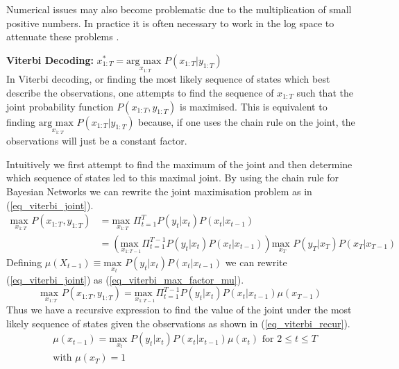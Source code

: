 \documentclass[../masters.tex]{subfiles}
\begin{document}
Numerical issues may also become problematic due to the multiplication of small positive numbers. In practice it is often necessary to work in the log space to attenuate these problems \cite{barber}. 

\textbf{Viterbi Decoding:} $x_{1:T}^* = \underset{x_{1:T}}{\text{arg max }} P(x_{1:T}|y_{1:T})$ \\
In Viterbi decoding, or finding the most likely sequence of states which best describe the observations, one attempts to find the sequence of $x_{1:T}$ such that the joint probability function $P(x_{1:T}, y_{1:T})$ is maximised. This is equivalent to finding $ \underset{x_{1:T}}{\text{arg max }} P(x_{1:T}|y_{1:T})$ because, if one uses the chain rule on the joint, the observations will just be a constant factor. 

Intuitively we first attempt to find the maximum of the joint and then determine which sequence of states led to this maximal joint. By using the chain rule for Bayesian Networks we can rewrite the joint maximisation problem as in (\ref{eq_viterbi_joint}).
\begin{equation}
\begin{aligned}
\underset{x_{1:T}}{\text{max }} P(x_{1:T}, y_{1:T}) &= \underset{x_{1:T}}{\text{max }} \Pi_{t=1}^T P(y_t|x_t) P(x_t|x_{t-1})\\
&= \left(\underset{x_{1:T-1}}{\text{max }} \Pi_{t=1}^{T-1} P(y_t|x_t) P(x_t|x_{t-1}) \right) \underset{x_{T}}{\text{max }} P(y_T|x_T) P(x_T|x_{T-1})
\end{aligned}
\label{eq_viterbi_joint}
\end{equation}
Defining $\mu(X_{t-1}) \equiv \underset{x_{t}}{\text{max }} P(y_t|x_t) P(x_t|x_{t-1})$ we can rewrite (\ref{eq_viterbi_joint}) as (\ref{eq_viterbi_max_factor_mu}).
\begin{equation}
\underset{x_{1:T}}{\text{max }} P(x_{1:T}, y_{1:T}) =\underset{x_{1:T-1}}{\text{max }} \Pi_{t=1}^{T-1} P(y_t|x_t) P(x_t|x_{t-1}) \mu(x_{T-1})
\label{eq_viterbi_max_factor_mu}
\end{equation}
Thus we have a recursive expression to find the value of the joint under the most likely sequence of states given the observations as shown in (\ref{eq_viterbi_recur}).
\begin{equation}
\begin{aligned}
&\mu(x_{t-1}) = \underset{x_{t}}{\text{max }} P(y_t|x_t) P(x_t|x_{t-1}) \mu(x_t) \text{ for } 2 \leq t \leq T \\
&\text{with } \mu(x_T) = 1 
\end{aligned}
\label{eq_viterbi_recur}
\end{equation}
\end{document}
